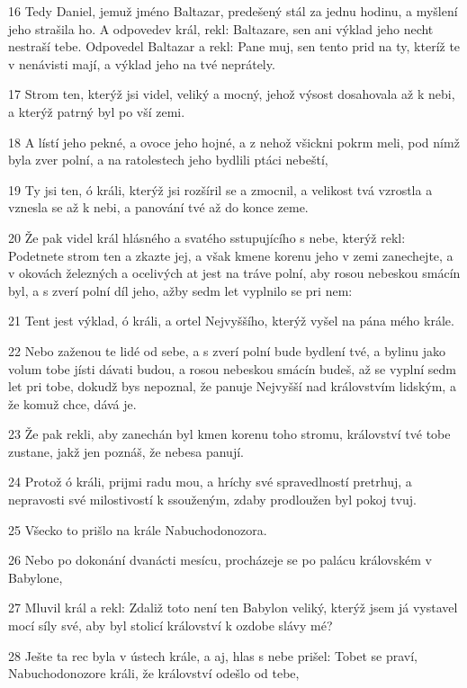 \par 16 Tedy Daniel, jemuž jméno Baltazar, predešený stál za jednu hodinu, a myšlení jeho strašila ho. A odpovedev král, rekl: Baltazare, sen ani výklad jeho necht nestraší tebe. Odpovedel Baltazar a rekl: Pane muj, sen tento prid na ty, kteríž te v nenávisti mají, a výklad jeho na tvé neprátely.
\par 17 Strom ten, kterýž jsi videl, veliký a mocný, jehož výsost dosahovala až k nebi, a kterýž patrný byl po vší zemi.
\par 18 A lístí jeho pekné, a ovoce jeho hojné, a z nehož všickni pokrm meli, pod nímž byla zver polní, a na ratolestech jeho bydlili ptáci nebeští,
\par 19 Ty jsi ten, ó králi, kterýž jsi rozšíril se a zmocnil, a velikost tvá vzrostla a vznesla se až k nebi, a panování tvé až do konce zeme.
\par 20 Že pak videl král hlásného a svatého sstupujícího s nebe, kterýž rekl: Podetnete strom ten a zkazte jej, a však kmene korenu jeho v zemi zanechejte, a v okovách železných a ocelivých at jest na tráve polní, aby rosou nebeskou smácín byl, a s zverí polní díl jeho, ažby sedm let vyplnilo se pri nem:
\par 21 Tent jest výklad, ó králi, a ortel Nejvyššího, kterýž vyšel na pána mého krále.
\par 22 Nebo zaženou te lidé od sebe, a s zverí polní bude bydlení tvé, a bylinu jako volum tobe jísti dávati budou, a rosou nebeskou smácín budeš, až se vyplní sedm let pri tobe, dokudž bys nepoznal, že panuje Nejvyšší nad královstvím lidským, a že komuž chce, dává je.
\par 23 Že pak rekli, aby zanechán byl kmen korenu toho stromu, království tvé tobe zustane, jakž jen poznáš, že nebesa panují.
\par 24 Protož ó králi, prijmi radu mou, a hríchy své spravedlností pretrhuj, a nepravosti své milostivostí k ssouženým, zdaby prodloužen byl pokoj tvuj.
\par 25 Všecko to prišlo na krále Nabuchodonozora.
\par 26 Nebo po dokonání dvanácti mesícu, procházeje se po palácu královském v Babylone,
\par 27 Mluvil král a rekl: Zdaliž toto není ten Babylon veliký, kterýž jsem já vystavel mocí síly své, aby byl stolicí království k ozdobe slávy mé?
\par 28 Ješte ta rec byla v ústech krále, a aj, hlas s nebe prišel: Tobet se praví, Nabuchodonozore králi, že království odešlo od tebe,
